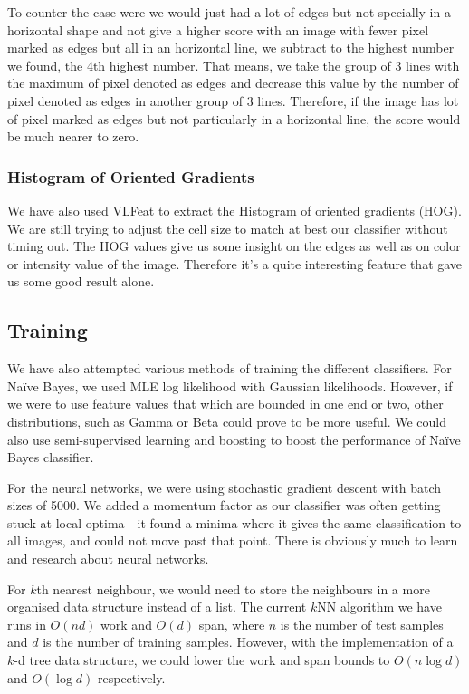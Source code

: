 \documentclass{article} %
\begin{document}
To counter the case were we would just had a lot of edges but not specially in a horizontal shape and not give a higher score with an image with fewer pixel marked as edges but all in an horizontal line, we subtract to the highest number we found, the 4th highest number. That means, we take the group of 3 lines with the maximum of pixel denoted as edges and decrease this value by the number of pixel denoted as edges in another group of 3 lines. Therefore, if the image has lot of pixel marked as edges but not particularly in a horizontal line, the score would be much nearer to zero. 

\subsubsection{Histogram of Oriented Gradients}
We have also used VLFeat to extract the Histogram of oriented gradients (HOG).
We are still trying to adjust the cell size to match at best our classifier without timing out. 
The HOG values give us some insight on the edges as well as on color or intensity value of the image. Therefore it's a quite interesting feature that gave us some good result alone. 

\subsection{Training}
We have also attempted various methods of training the different classifiers. For Na\"ive Bayes, we used MLE log likelihood with Gaussian likelihoods. However, if we were to use feature values that which are bounded in one end or two, other distributions, such as Gamma or Beta could prove to be more useful. We could also use semi-supervised learning and boosting to boost the performance of Na\"ive Bayes classifier.

For the neural networks, we were using stochastic gradient descent with batch sizes of 5000. We added a momentum factor as our classifier was often getting stuck at local optima - it found a minima where it gives the same classification to all images, and could not move past that point. There is obviously much to learn and research about neural networks.

For $k$th nearest neighbour, we would need to store the neighbours in a more organised data structure instead of a list. The current $k$NN algorithm we have runs in $O(nd)$ work and $O(d)$ span, where $n$ is the number of test samples and $d$ is the number of training samples. However, with the implementation of a $k$-d tree data structure, we could lower the work and span bounds to $O(n\log d)$ and $O(\log d)$ respectively.
\end{document}
